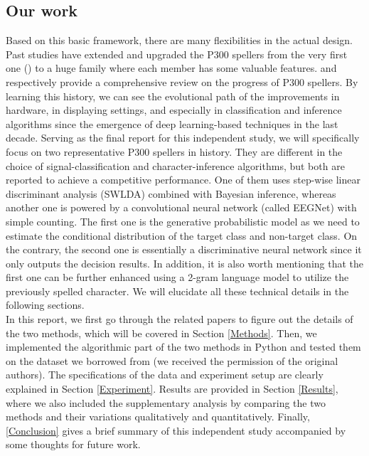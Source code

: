 \documentclass{article}
\begin{document}
\subsection{Our work} \label{Work}
Based on this basic framework, there are many flexibilities in the actual design. Past studies have extended and upgraded the P300 spellers from the very first one (\cite{farwell1988talking}) to a huge family where each member has some valuable features. \cite{elshout2009review} and \cite{fang2021recent} respectively provide a comprehensive review on the progress of P300 spellers. By learning this history, we can see the evolutional path of the improvements in hardware, in displaying settings, and especially in classification and inference algorithms since the emergence of deep learning-based techniques in the last decade. Serving as the final report for this independent study, we will specifically focus on two representative P300 spellers in history. They are different in the choice of signal-classification and character-inference algorithms, but both are reported to achieve a competitive performance. One of them uses step-wise linear discriminant analysis (SWLDA) combined with Bayesian inference, whereas another one is powered by a convolutional neural network (called EEGNet) with simple counting. The first one is the generative probabilistic model as we need to estimate the conditional distribution of the target class and non-target class. On the contrary, the second one is essentially a discriminative neural network since it only outputs the decision results. In addition, it is also worth mentioning that the first one can be further enhanced using a 2-gram language model to utilize the previously spelled character. We will elucidate all these technical details in the following sections.\\

\vspace{-3mm}
In this report, we first go through the related papers to figure out the details of the two methods, which will be covered in Section \ref{Methods}. Then, we implemented the algorithmic part of the two methods in Python and tested them on the dataset we borrowed from \cite{mainsah2014utilizing} (we received the permission of the original authors). The specifications of the data and experiment setup are clearly explained in Section \ref{Experiment}. Results are provided in Section \ref{Results}, where we also included the supplementary analysis by comparing the two methods and their variations qualitatively and quantitatively. Finally, \ref{Conclusion} gives a brief summary of this independent study accompanied by some thoughts for future work.
\end{document}
